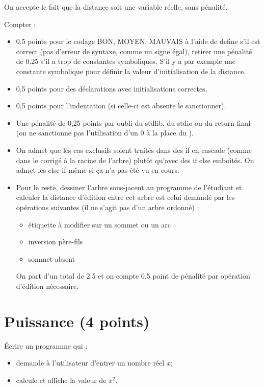 \begin{correction}
\end{correction}

\begin{baremeenv}
  On accepte le fait que la distance soit une variable réelle, sans pénalité. 

Compter :
\begin{itemize}
\item 
  0,5 points pour le codage BON, MOYEN, MAUVAIS à l'aide de define s'il est correct (pas d'erreur de syntaxe, comme un signe égal), retirer une pénalité de 0.25 s'il a trop de constantes symboliques. S'il y a par exemple une constante symbolique pour définir la valeur d'initialisation de la distance.
\item 0,5 points pour des
  déclarations avec initialisations correctes.  
\item 0,5 points pour l'indentation (si celle-ci est absente le sanctionner).
\item  Une pénalité de 0,25 points par oubli du stdlib, du  stdio ou du return final (on ne sanctionne pas l'utilisation d'un 0 à la place du ).
\item On admet que les cas exclusifs soient traités dans des if en cascade (comme dans le corrigé à la racine de l'arbre) plutôt qu'avec des if else emboîtés. On admet les else if même si ça n'a pas été vu en cours. 
\item Pour le reste, dessiner l'arbre sous-jacent au programme de l'étudiant et calculer la distance d'édition entre cet arbre est celui demandé par les opérations suivantes (il ne s'agit pas d'un arbre ordonné) :
  \begin{itemize}
  \item étiquette à modifier sur un sommet ou un arc
\item inversion père-fils
\item sommet absent
  \end{itemize}
On part d'un total de 2.5 et on compte 0.5 point de pénalité par opération d'édition nécessaire.  
\end{itemize}
\end{baremeenv}

\section{Puissance (4 points)}

\question
{}
Écrire un programme qui :
\begin{itemize}
\item   demande à l'utilisateur d'entrer un nombre réel $x$;
\item calcule et affiche la valeur de $x^2$.
\end{itemize}


